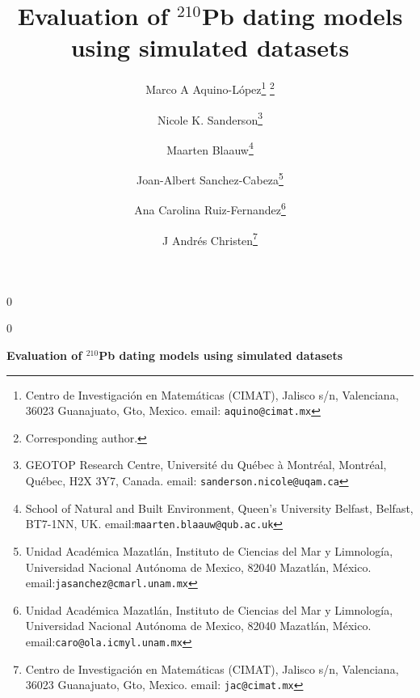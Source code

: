 \documentclass [10pt] {article}
\date{ }
\newcommand{\blind}{0}
\newcommand{\papertitle}{
	Evaluation of $^{210}$Pb dating models using simulated datasets
}
\begin{document}
	\def\spacingset#1{\renewcommand{\baselinestretch}%
		{#1}\small\normalsize} \spacingset{1}
	\blind
	{
		\title{\textbf{\papertitle}}

		\author{Marco A Aquino-L\'opez\thanks{
				Centro de Investigaci\'on en Matem\'aticas (CIMAT),
				Jalisco s/n, Valenciana, 36023 Guanajuato, Gto, Mexico.
				email: \texttt{aquino@cimat.mx} } \thanks{Corresponding author.}
					\and
			Nicole K. Sanderson\thanks{
				GEOTOP Research Centre, Université du Québec à Montréal, 
				Montréal, Québec, H2X 3Y7, Canada. 
				email: \texttt{sanderson.nicole@uqam.ca}}
					\and
			Maarten Blaauw\thanks{School of Natural and Built Environment,
				Queen's University Belfast,
				Belfast, BT7-1NN, UK.
				email:\texttt{maarten.blaauw@qub.ac.uk}  }
					\and
			Joan-Albert Sanchez-Cabeza\thanks{
				Unidad Acad\'emica Mazatl\'an, 
				Instituto de Ciencias del Mar y Limnolog\'ia, 
				Universidad Nacional Aut\'onoma de Mexico, 
				82040 Mazatl\'an, M\'exico.
				email:\texttt{jasanchez@cmarl.unam.mx}} 
					\and
			Ana Carolina Ruiz-Fernandez\thanks{
				Unidad Acad\'emica Mazatl\'an, 
				Instituto de Ciencias del Mar y Limnolog\'ia, 
				Universidad Nacional Aut\'onoma de Mexico, 
				82040 Mazatl\'an, M\'exico.
				email:\texttt{caro@ola.icmyl.unam.mx}} 
					\and
			J Andr\'es Christen\thanks{
				Centro de Investigaci\'on en Matem\'aticas (CIMAT),
				Jalisco s/n, Valenciana, 36023 Guanajuato, Gto, Mexico.
				email: \texttt{jac@cimat.mx}  }
			}
		\maketitle
	} \fi

	\blind
	{
		\bigskip
		\bigskip
		\bigskip
		\begin{center}
			{\LARGE\bf \papertitle}
		\end{center}
		\medskip
	} \fi
\bigskip
\end{document}
